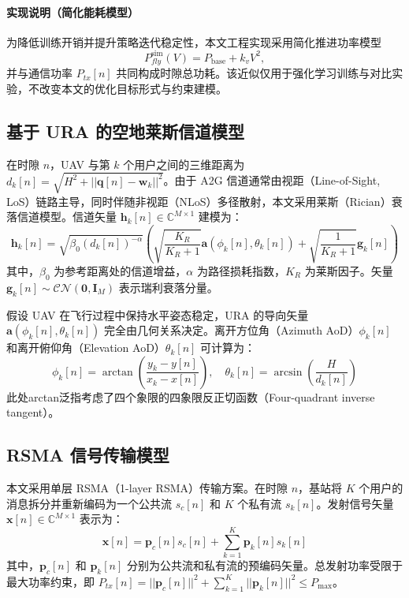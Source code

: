 \documentclass[journal,onecolumn]{IEEEtran}
\begin{document}
	\paragraph{实现说明（简化能耗模型）}
	为降低训练开销并提升策略迭代稳定性，本文工程实现采用简化推进功率模型
	\begin{equation}
		P_{fly}^{\text{sim}}(V)=P_{\text{base}}+k_v V^2,
	\end{equation}
	并与通信功率 $P_{tx}[n]$ 共同构成时隙总功耗。该近似仅用于强化学习训练与对比实验，不改变本文的优化目标形式与约束建模。
	
	\subsection{基于 URA 的空地莱斯信道模型}
	在时隙 $n$，UAV 与第 $k$ 个用户之间的三维距离为 $d_k[n] = \sqrt{H^2 + ||\mathbf{q}[n] - \mathbf{w}_k||^2}$。由于 A2G 信道通常由视距（Line-of-Sight, LoS）链路主导，同时伴随非视距（NLoS）多径散射，本文采用莱斯（Rician）衰落信道模型。信道矢量 $\mathbf{h}_k[n] \in \mathbb{C}^{M \times 1}$ 建模为：
	\begin{equation}
		\mathbf{h}_k[n] = \sqrt{\beta_0 (d_k[n])^{-\alpha}} \left( \sqrt{\frac{K_R}{K_R+1}} \mathbf{a}(\phi_k[n], \theta_k[n]) + \sqrt{\frac{1}{K_R+1}} \mathbf{g}_k[n] \right)
		\label{eq:channel}
	\end{equation}
	其中，$\beta_0$ 为参考距离处的信道增益，$\alpha$ 为路径损耗指数，$K_R$ 为莱斯因子。矢量 $\mathbf{g}_k[n] \sim \mathcal{CN}(\mathbf{0}, \mathbf{I}_M)$ 表示瑞利衰落分量。
	
	假设 UAV 在飞行过程中保持水平姿态稳定，URA 的导向矢量 $\mathbf{a}(\phi_k[n], \theta_k[n])$ 完全由几何关系决定。离开方位角（Azimuth AoD）$\phi_k[n]$ 和离开俯仰角（Elevation AoD）$\theta_k[n]$ 可计算为：
	\begin{equation}
		\phi_k[n] = \arctan \left( \frac{y_k - y[n]}{x_k - x[n]} \right), \quad \theta_k[n] = \arcsin \left( \frac{H}{d_k[n]} \right)
		\label{eq:angles}
	\end{equation}
	此处arctan泛指考虑了四个象限的四象限反正切函数（Four-quadrant inverse tangent）。
	
	\subsection{RSMA 信号传输模型}
	本文采用单层 RSMA（1-layer RSMA）传输方案。在时隙 $n$，基站将 $K$ 个用户的消息拆分并重新编码为一个公共流 $s_c[n]$ 和 $K$ 个私有流 $s_k[n]$。发射信号矢量 $\mathbf{x}[n] \in \mathbb{C}^{M \times 1}$ 表示为：
	\begin{equation}
		\mathbf{x}[n] = \mathbf{p}_c[n] s_c[n] + \sum_{k=1}^K \mathbf{p}_k[n] s_k[n]
		\label{eq:transmit_signal}
	\end{equation}
	其中，$\mathbf{p}_c[n]$ 和 $\mathbf{p}_k[n]$ 分别为公共流和私有流的预编码矢量。总发射功率受限于最大功率约束，即 $P_{tx}[n] = ||\mathbf{p}_c[n]||^2 + \sum_{k=1}^K ||\mathbf{p}_k[n]||^2 \leq P_{\max}$。
	
\end{document}
